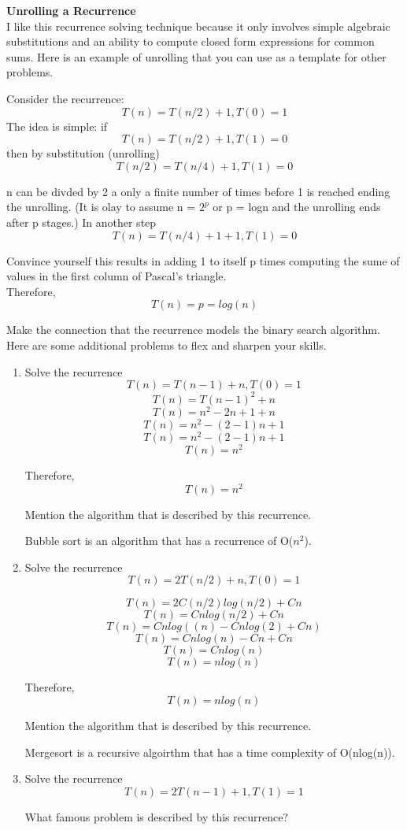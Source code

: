 \documentclass{article}
\begin{document}
\noindent \textbf{Unrolling a Recurrence}\\

\noindent I like this recurrence solving technique because it only involves
simple algebraic substitutions and an ability to compute closed form expressions
for common sums. Here is an example of unrolling that you can use as a template
for other problems.

Consider the recurrence:
\[ T(n) = T(n/2) + 1, T(0) = 1 \]
The idea is simple: if
\[ T(n) = T(n/2) + 1, T(1) = 0 \]
then by substitution (unrolling)
\[ T(n/2) = T(n/4) + 1, T(1) = 0 \]

\noindent n can be divded by 2 a only a finite number of times before 1 is
reached ending the unrolling. (It is olay to assume n = $2^p$ or p = logn and the
unrolling ends after p stages.) In another step
\[ T(n) = T(n/4) + 1 + 1, T(1) = 0 \]

\noindent Convince yourself this results in adding 1 to itself p times computing
the sume of values in the first column of Pascal's triangle.\\
Therefore,
\[ T(n) = p = log(n) \]

\noindent Make the connection that the recurrence models the binary search algorithm.\\
\noindent Here are some additional problems to flex and sharpen your skills.

\begin{enumerate}
    \item Solve the recurrence
            \[ T(n) = T(n-1) + n, T(0) = 1 \]
            \[ T(n) = T(n-1)^2 + n\]
            \[ T(n) = n^2 -2n + 1 + n\]
            \[ T(n) = n^2 - (2-1)n + 1\]
            \[ T(n) = n^2 - (2-1)n + 1\]
            \[T(n) = n^2\]

            Therefore, \[T(n) = n^2\]

            Mention the algorithm that is described by this recurrence.

            Bubble sort is an algorithm that has a recurrence of O($n^2$).
    \item Solve the recurrence
            \[ T(n) = 2T(n/2) + n, T(0) = 1\]
        
            \[ T(n) = 2C(n/2)log(n/2) + Cn \]
            \[ T(n) = Cnlog(n/2) + Cn \]
            \[ T(n) = Cnlog((n) - Cnlog(2) + Cn) \]
            \[ T(n) = Cnlog(n) - Cn + Cn \]
            \[ T(n) = Cnlog(n) \]
            \[ T(n) = nlog(n) \]

            Therefore, \\
            \[T(n) = nlog(n)\]

            Mention the algorithm that is described by this recurrence.

            Mergesort is a recursive algoirthm that has a time complexity of O(nlog(n)).
    \item Solve the recurrence
            \[ T(n) = 2T(n-1) + 1, T(1) = 1 \]
            
            What famous problem is described by this recurrence?
\end{enumerate}
\end{document}
